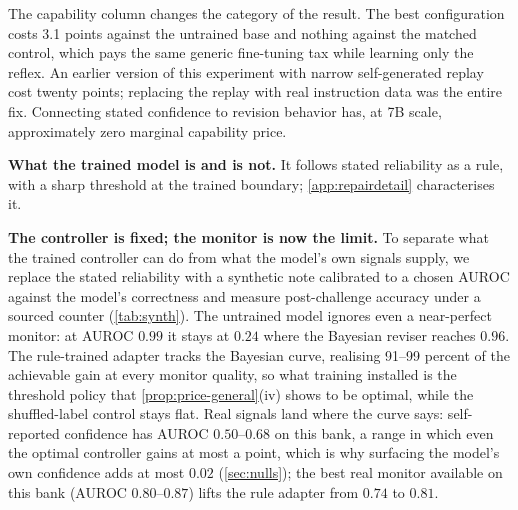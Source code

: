 \documentclass{article}
\begin{document}
The capability column changes the category of the result. The best configuration costs 3.1 points against the untrained base and nothing against the matched control, which pays the same generic fine-tuning tax while learning only the reflex. An earlier version of this experiment with narrow self-generated replay cost twenty points; replacing the replay with real instruction data was the entire fix. Connecting stated confidence to revision behavior has, at 7B scale, approximately zero marginal capability price.

\textbf{What the trained model is and is not.} It follows stated reliability as a rule, with a sharp threshold at the trained boundary; \cref{app:repairdetail} characterises it.




\textbf{The controller is fixed; the monitor is now the limit.} To separate what the trained controller can do from what the model's own signals supply, we replace the stated reliability with a synthetic note calibrated to a chosen AUROC against the model's correctness and measure post-challenge accuracy under a sourced counter (\cref{tab:synth}). The untrained model ignores even a near-perfect monitor: at AUROC $0.99$ it stays at $0.24$ where the Bayesian reviser reaches $0.96$. The rule-trained adapter tracks the Bayesian curve, realising 91--99 percent of the achievable gain at every monitor quality, so what training installed is the threshold policy that \cref{prop:price-general}(iv) shows to be optimal, while the shuffled-label control stays flat. Real signals land where the curve says: self-reported confidence has AUROC $0.50$--$0.68$ on this bank, a range in which even the optimal controller gains at most a point, which is why surfacing the model's own confidence adds at most $0.02$ (\cref{sec:nulls}); the best real monitor available on this bank (AUROC $0.80$--$0.87$) lifts the rule adapter from $0.74$ to $0.81$.
\end{document}
